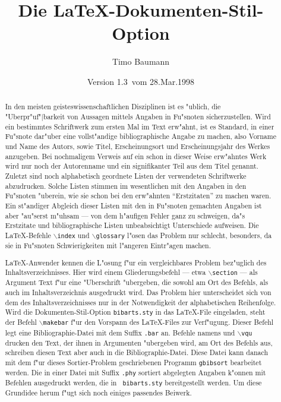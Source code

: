\documentclass[11pt]{article}                    %
\title{\sf Die \LaTeX-Dokumenten-Stil-Option \bibarts}
\author{\sc Timo Baumann}
\date{\sf Version 1.3\, vom 28.Mar.1998}
\def\Befehl#1{{\tt$\backslash$#1}}
\begin{document}
  \maketitle

  \noindent\hrulefill

  \begin{abstract}
  In den meisten geisteswissenschaftlichen Disziplinen ist es "ublich, die
  "Uberpr"uf"|barkeit von Aussagen mittels Angaben in Fu"snoten
  sicherzustellen. Wird ein bestimmtes Schriftwerk zum ersten Mal im Text
  erw"ahnt, ist es Standard, in einer Fu"snote dar"uber eine vollst"andige
  bib\-lio\-gra\-phische Angabe zu machen, also Vorname und Name des
  Autors, sowie Titel, Erscheinungsort und Erscheinungsjahr des Werkes
  anzugeben. Bei nochmaligem Verweis auf ein schon in dieser Weise erw"ahntes
  Werk wird nur noch der Autorenname und ein signifikanter Teil aus dem
  Titel genannt. Zuletzt sind noch alphabetisch geordnete Listen der
  verwendeten Schriftwerke abzudrucken. Solche Listen stimmen im wesentlichen
  mit den Angaben in den Fu"snoten "uberein, wie sie schon bei den erw"ahnten
  "`Erstzitaten"' zu machen waren. Ein st"andiger Abgleich dieser Listen mit
  den in Fu"snoten gemachten Angaben ist aber "au"serst m"uhsam --- von dem
  h"aufigen Fehler ganz zu schweigen, da"s Erstzitate und bibliographische
  Listen unbeabsichtigt Unterschiede aufweisen. Die \LaTeX-Befehle
  \Befehl{index} und \Befehl{glossary} l"osen das Problem nur schlecht,
  besonders, da sie in Fu"snoten Schwierigkeiten mit l"angeren Eintr"agen
  machen.

  \LaTeX-Anwender kennen die L"osung f"ur ein vergleichbares Problem
  bez"uglich des Inhaltsverzeichnisses. Hier wird einem Gliederungsbefehl
  --- etwa \Befehl{section} --- als Argument Text f"ur eine "Uberschrift
  "ubergeben, die sowohl am Ort des Befehls, als auch im Inhaltsverzeichnis
  ausgedruckt wird. Das Problem hier unterscheidet sich von dem des
  Inhaltsverzeichnisses nur in der Notwendigkeit der alphabetischen
  Reihenfolge. Wird die Dokumenten-Stil-Option {\tt bibarts.sty} in das
  \LaTeX-File eingeladen, steht der Befehl
  \Befehl{makebar}\addtobib{makebar@\protect\Befehl{makebar}} f"ur den
  Vorspann des \LaTeX-Files zur Verf"ugung. Dieser Befehl legt eine
  Bib\-lio\-gra\-phie-Datei mit dem Suffix {\tt$\!$.bar} an. Befehle namens
  \printonlybib{\Befehl{vli}} und
  \Befehl{vqu}\addtobib{vqu@\protect\Befehl{vqu}} drucken den Text, der ihnen
  in Argumenten "ubergeben wird, am Ort des Befehls aus, schreiben diesen
  Text aber auch in die Bib\-lio\-gra\-phie-Datei. Diese Datei kann danach
  mit dem f"ur dieses Sortier-Problem geschriebenen Programm {\tt gbibsort}
  bearbeitet werden. Die in einer Datei mit Suffix {\tt$\!$.phy} sortiert
  abgelegten Angaben k"onnen mit Befehlen ausgedruckt werden, die in {\tt
  bibarts.sty} bereitgestellt werden. Um diese Grundidee herum f"ugt sich
  noch einiges passendes Beiwerk.
  \end{abstract}
\end{document}
